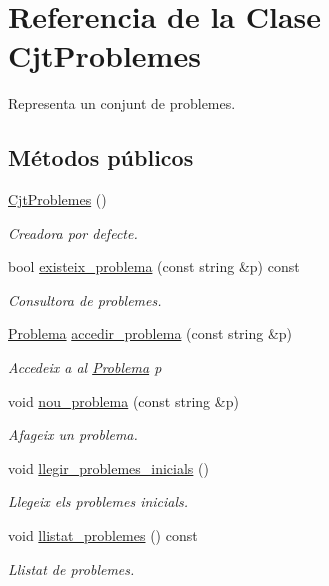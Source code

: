 \hypertarget{class_cjt_problemes}{}\section{Referencia de la Clase Cjt\+Problemes}
\label{class_cjt_problemes}


Representa un conjunt de problemes.  


\subsection*{Métodos públicos}
\begin{DoxyCompactItemize}
\item 
\mbox{\hyperlink{class_cjt_problemes_ae6f76d8e493e80bba4fc28a124826cb5}{Cjt\+Problemes}} ()
\begin{DoxyCompactList}\small\item\em Creadora por defecte. \end{DoxyCompactList}\item 
bool \mbox{\hyperlink{class_cjt_problemes_a27f5be292f79fd47915093fb84013e67}{existeix\+\_\+problema}} (const string \&p) const
\begin{DoxyCompactList}\small\item\em Consultora de problemes. \end{DoxyCompactList}\item 
\mbox{\hyperlink{class_problema}{Problema}} \mbox{\hyperlink{class_cjt_problemes_a2db39d9fee16e50c9a0ddfa1a5a2e460}{accedir\+\_\+problema}} (const string \&p)
\begin{DoxyCompactList}\small\item\em Accedeix a al \mbox{\hyperlink{class_problema}{Problema}} {\itshape p} \end{DoxyCompactList}\item 
void \mbox{\hyperlink{class_cjt_problemes_a7a41c837128c629f7a4dcf81b1592581}{nou\+\_\+problema}} (const string \&p)
\begin{DoxyCompactList}\small\item\em Afageix un problema. \end{DoxyCompactList}\item 
void \mbox{\hyperlink{class_cjt_problemes_ac320f52e566402ed341d2f67176be14a}{llegir\+\_\+problemes\+\_\+inicials}} ()
\begin{DoxyCompactList}\small\item\em Llegeix els problemes inicials. \end{DoxyCompactList}\item 
void \mbox{\hyperlink{class_cjt_problemes_a4f47e1d0800f32093efa7569f58d8105}{llistat\+\_\+problemes}} () const
\begin{DoxyCompactList}\small\item\em Llistat de problemes. \end{DoxyCompactList}\end{DoxyCompactItemize}


